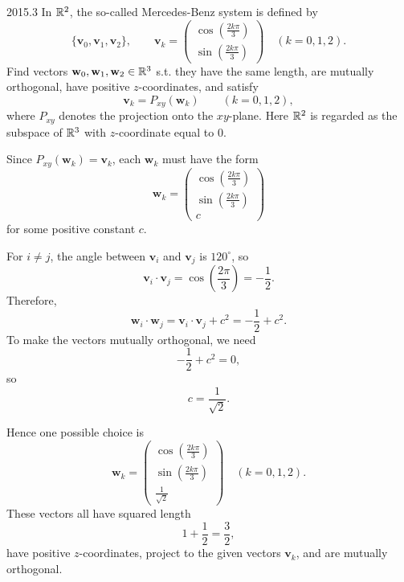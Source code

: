     \begin{pastproblem}{2015.3}
        In $\mathbb{R}^2$, the so-called Mercedes-Benz system is defined by
        \[
            \{\mathbf{v}_0,\mathbf{v}_1,\mathbf{v}_2\},
            \qquad
            \mathbf{v}_k
            =
            \begin{pmatrix}
                \cos\left(\frac{2k\pi}{3}\right) \\
                \sin\left(\frac{2k\pi}{3}\right)
            \end{pmatrix}
            \quad
            (k=0,1,2).
        \]
        Find vectors $\mathbf{w}_0,\mathbf{w}_1,\mathbf{w}_2\in\mathbb{R}^3$ s.t. they have the same
        length, are mutually orthogonal, have positive $z$-coordinates, and satisfy
        \[
            \mathbf{v}_k=P_{xy}(\mathbf{w}_k)
            \qquad
            (k=0,1,2),
        \]
        where $P_{xy}$ denotes the projection onto the $xy$-plane. Here $\mathbb{R}^2$ is regarded as the
        subspace of $\mathbb{R}^3$ with $z$-coordinate equal to $0$.
    \end{pastproblem}

    \begin{solution}
        Since $P_{xy}(\mathbf{w}_k)=\mathbf{v}_k$, each $\mathbf{w}_k$ must have the form
        \[
            \mathbf{w}_k
            =
            \begin{pmatrix}
                \cos\left(\frac{2k\pi}{3}\right) \\
                \sin\left(\frac{2k\pi}{3}\right) \\
                c
            \end{pmatrix}
        \]
        for some positive constant $c$.

        For $i\neq j$, the angle between $\mathbf{v}_i$ and $\mathbf{v}_j$ is $120^\circ$, so
        \[
            \mathbf{v}_i\cdot\mathbf{v}_j
            =
            \cos\left(\frac{2\pi}{3}\right)
            =
            -\frac{1}{2}.
        \]
        Therefore,
        \[
            \mathbf{w}_i\cdot\mathbf{w}_j
            =
            \mathbf{v}_i\cdot\mathbf{v}_j+c^2
            =
            -\frac{1}{2}+c^2.
        \]
        To make the vectors mutually orthogonal, we need
        \[
            -\frac{1}{2}+c^2=0,
        \]
        so
        \[
            c=\frac{1}{\sqrt{2}}.
        \]

        Hence one possible choice is
        \[
            \boxed{
            \mathbf{w}_k
            =
            \begin{pmatrix}
                \cos\left(\frac{2k\pi}{3}\right) \\
                \sin\left(\frac{2k\pi}{3}\right) \\
                \frac{1}{\sqrt{2}}
            \end{pmatrix}
            \quad
            (k=0,1,2)
            }.
        \]
        These vectors all have squared length
        \[
            1+\frac{1}{2}
            =
            \frac{3}{2},
        \]
        have positive $z$-coordinates, project to the given vectors $\mathbf{v}_k$, and are mutually
        orthogonal.
    \end{solution}

